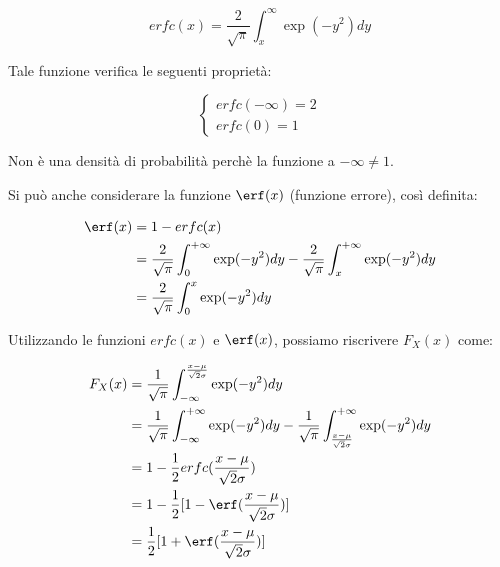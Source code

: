 {
    \Large 
    \begin{equation}
        erfc(x) 
        = 
        \frac{2}{\sqrt{\pi}} 
        \int_{x}^{\infty} 
        \exp(- y^{2}) dy
    \end{equation}
}

Tale funzione verifica le seguenti proprietà: 

{
    \Large 
    \begin{equation}
        \begin{cases}
            erfc(-\infty) = 2 \\ 
            erfc(0) = 1
        \end{cases}
    \end{equation}
}

Non è una densità di probabilità perchè la funzione a $-\infty \neq 1$. \newline 

Si può anche considerare la funzione $\erf(x)$ (funzione errore), così definita:

{
    \Large 
    \begin{equation}
        \begin{split}
            \erf(x) 
            &= 
            1 - erfc(x) 
            \\ 
            &= 
            \frac{2}{\sqrt{\pi}}
            \int_{0}^{+ \infty} 
            \exp(- y^{2}) dy 
            - 
            \frac{2}{\sqrt{\pi}}
            \int_{x}^{+ \infty} 
            \exp(- y^{2}) dy
            \\ 
            &= 
            \frac{2}{\sqrt{\pi}}
            \int_{0}^{x} 
            \exp(- y^{2}) dy  
        \end{split}
    \end{equation}
}


Utilizzando le funzioni $erfc(x)$ e $\erf(x)$, possiamo riscrivere $F_X (x)$ come: 

{
    \Large 
    \begin{equation}
        \begin{split}
            F_X (x) 
            &= 
            \frac{1}{\sqrt{\pi}}
            \int_{- \infty}^{\frac{x - \mu}{\sqrt{2} \sigma}} 
            \exp(-y^{2}) dy
            \\ 
            &= 
            \frac{1}{\sqrt{\pi}}
            \int_{- \infty}^{ + \infty} 
            \exp(-y^{2}) dy 
            - 
            \frac{1}{\sqrt{\pi}}
            \int_{\frac{x - \mu}{\sqrt{2} \sigma}}^{ + \infty} 
            \exp(-y^{2}) dy
            \\ 
            &=
            1 - \frac{1}{2} erfc(\frac{x - \mu}{\sqrt{2} \sigma})
            \\ 
            &= 
            1 - \frac{1}{2} 
            [1 - \erf(\frac{x - \mu}{\sqrt{2} \sigma})]
            \\ 
            &= 
            \frac{1}{2} 
            [1 + \erf(\frac{x - \mu}{\sqrt{2} \sigma})]
        \end{split}
    \end{equation}
}


